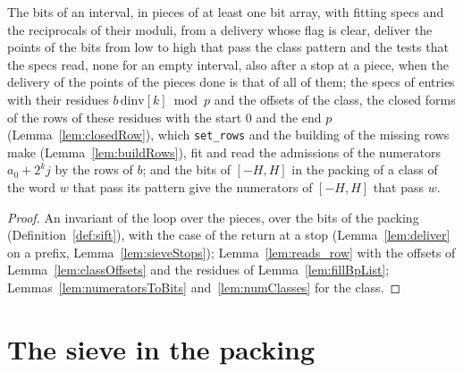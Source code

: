 \begin{lemma}\label{lem:siftBits}
  \leanok
  The bits of an interval, in pieces of at least one bit array, with fitting specs and the
  reciprocals of their moduli, from a delivery whose flag is clear, deliver the points of the bits
  from $\mathrm{low}$ to $\mathrm{high}$ that pass the class pattern and the tests that the specs
  read, none for an empty interval, also after a stop at a piece, when the delivery of the points of
  the pieces done is that of all of them; the specs of entries with their residues
  $b\,\mathrm{dinv}[k] \bmod p$ and the offsets of the class, the closed forms of the rows of these
  residues with the start $0$ and the end $p$ (Lemma~\ref{lem:closedRow}), which \verb|set_rows| and
  the building of the missing rows make (Lemma~\ref{lem:buildRows}), fit and read the admissions of
  the numerators $a_0 + 2^k j$ by the rows of $b$; and the bits of $[-H, H]$ in the packing of a
  class of the word $w$ that pass its pattern give the numerators of $[-H, H]$ that pass $w$.
\end{lemma}

\begin{proof}
  \leanok
  An invariant of the loop over the pieces, over the bits of the packing
  (Definition~\ref{def:sift}), with the case of the return at a stop (Lemma~\ref{lem:deliver} on a
  prefix, Lemma~\ref{lem:sieveStops}); Lemma~\ref{lem:reads_row} with the offsets of
  Lemma~\ref{lem:classOffsets} and the residues of Lemma~\ref{lem:fillBpList};
  Lemmas~\ref{lem:numeratorsToBits} and~\ref{lem:numClasses} for the class.
\end{proof}

\section{The sieve in the packing}\label{sec:packedSieve}

